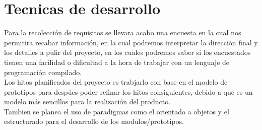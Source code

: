 \documentclass[10pt,executivepaper]{article}
\begin{document}
\section{Tecnicas de desarrollo}
Para la recolección de requisitos se llevara acabo una encuesta en la cual nos permitira recabar información, en la cual podremos interpretar la dirección final y los detalles a pulir del proyecto, en los cuales podremos saber si los encuestados tienen una facilidad o dificultad a la hora de trabajar con un lenguaje de programación compilado.\\
Los hitos planificados del proyecto es trabjarlo con base en el modelo de prototipos para despúes poder refinar los hitos consiguientes, debido a que es un modelo más sencillos para la realización del producto.\\
Tambien se planea el uso de paradigmas como el orientado a objetos y el estructurado para el desarrollo de los modulos/prototipos.
\printindex
\end{document}

